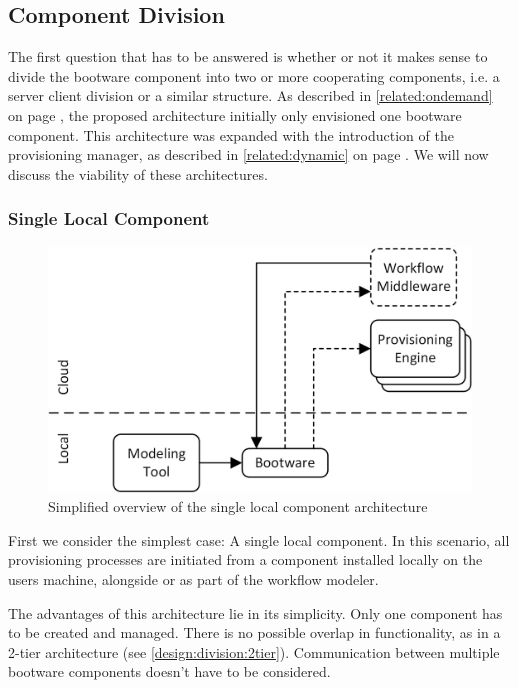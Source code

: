 \subsection{Component Division}

The first question that has to be answered is whether or not it makes sense to divide the bootware component into two or more cooperating components, i.e. a server client division or a similar structure.
As described in \autoref{related:ondemand} on page \pageref{related:ondemand}, the proposed architecture initially only envisioned one bootware component.
This architecture was expanded with the introduction of the provisioning manager, as described in \autoref{related:dynamic} on page \pageref{related:dynamic}.
We will now discuss the viability of these architectures.

\subsubsection{Single Local Component}

\begin{figure}[!htbp]
	\centering
	\includegraphics[resolution=600]{design/assets/simple_local}
	\caption{Simplified overview of the single local component architecture}
	\label{image:single_local}
\end{figure}

First we consider the simplest case: A single local component.
In this scenario, all provisioning processes are initiated from a component installed locally on the users machine, alongside or as part of the workflow modeler.

The advantages of this architecture lie in its simplicity.
Only one component has to be created and managed.
There is no possible overlap in functionality, as in a 2-tier architecture (see \autoref{design:division:2tier}).
Communication between multiple bootware components doesn't have to be considered.

